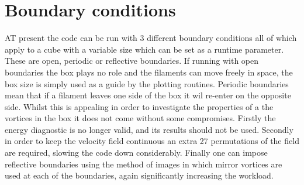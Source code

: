 \documentclass[12pt]{article}
\begin{document}
\section{Boundary conditions}
 AT present the code can be run with 3 different boundary conditions all of which apply to a cube with a variable size which can be set as a runtime parameter.
These are open, periodic or reflective boundaries.
If running with open boundaries the box plays no role and the filaments can move freely in space, the box size is simply used as a guide by the plotting routines.
Periodic boundaries mean that if a filament leaves one side of the box it wil re-enter on the opposite side.
Whilst this is appealing in order to investigate the properties of a the vortices in the box it does not come without some compromises.
Firstly the energy diagnostic is no longer valid, and its results should not be used.
Secondly in order to keep the velocity field continuous an extra 27 permutations of the field are required, slowing the code down considerably.
Finally one can impose reflective boundaries using the method of images in which mirror vortices are used at each of the boundaries, again significantly increasing the workload.
\end{document}
